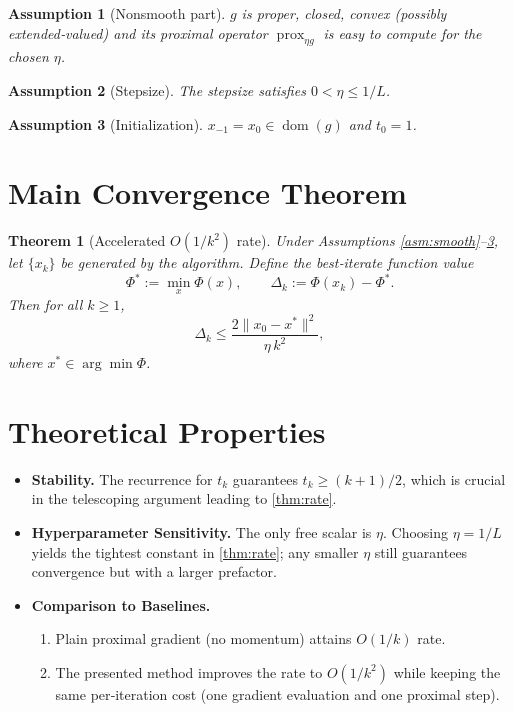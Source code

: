 \documentclass{article}
\newtheorem{theorem}{Theorem}
\newtheorem{assumption}{Assumption}
\newcommand{\prox}{\operatorname{prox}}
\begin{document}
\begin{assumption}[Nonsmooth part]
\label{asm:ns}
$g$ is proper, closed, convex (possibly extended‑valued) and its proximal operator
$\prox_{\eta g}$ is easy to compute for the chosen $\eta$.
\end{assumption}

\begin{assumption}[Stepsize]
\label{asm:stepsize}
The stepsize satisfies $0<\eta\le 1/L$.
\end{assumption}

\begin{assumption}[Initialization]
\label{asm:init}
$x_{-1}=x_{0}\in\operatorname{dom}(g)$ and $t_{0}=1$.
\end{assumption}

\section*{Main Convergence Theorem}
\begin{theorem}[Accelerated $O(1/k^{2})$ rate]\label{thm:rate}
Under Assumptions \ref{asm:smooth}–\ref{asm:init}, let $\{x_{k}\}$ be generated by the algorithm.  
Define the best‑iterate function value
\[
\Phi^{*}:=\min_{x}\Phi(x),\qquad
\Delta_{k}:=\Phi(x_{k})-\Phi^{*}.
\]
Then for all $k\ge 1$,
\[
\boxed{\Delta_{k}\le \frac{2\|x_{0}-x^{*}\|^{2}}{\eta\,k^{2}}},\tag{4}
\]
where $x^{*}\in\arg\min\Phi$.
\end{theorem}

\section*{Theoretical Properties}
\begin{itemize}[nosep]
\item \textbf{Stability.} The recurrence for $t_{k}$ guarantees $t_{k}\ge (k+1)/2$, which is crucial in the telescoping argument leading to \eqref{thm:rate}.
\item \textbf{Hyperparameter Sensitivity.} The only free scalar is $\eta$. Choosing $\eta=1/L$ yields the tightest constant in \eqref{thm:rate}; any smaller $\eta$ still guarantees convergence but with a larger prefactor.
\item \textbf{Comparison to Baselines.}
\begin{enumerate}[nosep]
\item Plain proximal gradient (no momentum) attains $O(1/k)$ rate.
\item The presented method improves the rate to $O(1/k^{2})$ while keeping the same per‑iteration cost (one gradient evaluation and one proximal step).
\end{enumerate}
\end{itemize}
\end{document}
